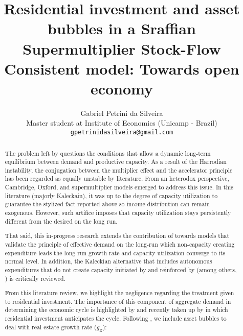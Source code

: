 \documentclass{article}
\title{Residential investment and asset bubbles in a Sraffian Supermultiplier Stock-Flow Consistent model: Towards open economy}
\author{
  Gabriel Petrini da Silveira\\
  Master student at Institute of Economics (Unicamp - Brazil)\\
  \texttt{gpetrinidasilveira@gmail.com} \\
}
\begin{document}
\maketitle

\begin{abstract}
The problem left by \textcite{harrod_essay_1939} questions the conditions that allow a dynamic long-term equilibrium between demand and productive capacity. 
As a result of the Harrodian instability, the conjugation between the multiplier effect and the accelerator principle has been regarded as equally unstable by literature. 
From an heterodox perspective, Cambridge, Oxford, and supermultiplier models emerged to address this issue. 
In this literature (majorly Kaleckain), it was up to the degree of capacity utilization to guarantee the stylized fact reported above so income distribution can remain  exogenous. 
However, such artifice imposes that capacity utilization  stays persistently different from the desired on the long run. 

That said, this in-progress research extends the contribution of \textcite{serrano_sraffian_1995} towards models that validate the principle of effective demand on the long-run which non-capacity creating expenditure leads the long run growth rate and capacity utilization converge to its normal level. 
In addition, the Kaleckian alternative  that includes autonomous expenditures that do not create capacity initiated by \textcite{allain_tackling_2015} and reinforced by \textcite{lavoie_convergence_2016} (among others,  \cites{dutt_growth_2016}{dutt_observations_2018}{hein_autonomous_2018}{nah_long-run_2017})  is critically reviewed. 

From this literature review, we highlight the negligence regarding the treatment given to residential investment. 
The importance of this component of aggregate demand in determining the economic cycle is highlighted by \textcite{leamer_housing_2007} and recently taken up by \textcite{fiebiger_semi-autonomous_2018} in which residential investment anticipates the cycle. Following \textcite{da_silva_teixeira_crescimento_2015}, we include asset bubbles to deal with real estate growth rate ($g_Z$):


\end{abstract}
\end{document}
